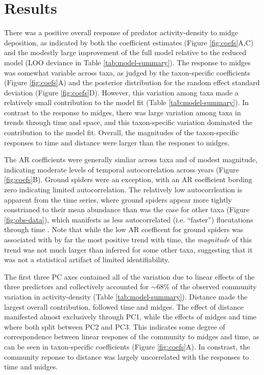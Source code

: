 

\section*{Results}

There was a positive overall response of predator activity-density to midge deposition,
as indicated by both the coefficient estimates (Figure \ref{fig:coefs}A,C)
and the modestly large improvement of the full model
relative to the reduced model (LOO deviance in Table \ref{tab:model-summary}).
The response to midges was somewhat variable across taxa,
as judged by the taxon-specific coefficients (Figure \ref{fig:coefs}A)
and the posterior distribution
for the random effect standard deviation (Figure \ref{fig:coefs}D).
However, this variation among taxa made a relatively small contribution
to the model fit (Table \ref{tab:model-summary}).
In contrast to the response to midges,
there was large variation among taxa in trends through time and space,
and this taxon-specific variation dominated the contribution to the model fit.
Overall, the magnitudes of the taxon-specific responses to time and distance
were larger than the respones to midges.

The AR coefficients were generally simliar across taxa and of modest magnitude,
indicating moderate levels of temporal autocorrelation across years
(Figure \ref{fig:coefs}B).
Ground spiders were an exception,
with an AR coefficient bording zero indicating limited autocorrelation.
The relatively low autocorrleation is apparent from the time series,
where ground spiders appear more tightly constrianed to their mean abundance
than was the case for other taxa (Figure \ref{fig:obs-data}),
which manifests as less autocorrelated (i.e. ``faster'') flucutations through time
\citep{Ziebarth2010}.
Note that while the low AR coefficent for ground spiders was associated
with by far the most positive trend with time,
the \textit{magnitude} of this trend was not much larger than inferred for some other taxa,
suggesting that it was not a statistical artifact of limited identifiability.

The first three PC axes contained all of the variation
due to linear effects of the three predictors and
collectively accounted for $\sim$68\% of the observed community variation
in activity-density (Table \ref{tab:model-summary}).
Distance made the largest overall contribution,
followed time and midges.
The effect of distance manifested almost exclusively through PC1,
while the effects of midges and time where both split between PC2 and PC3.
This indicates some degree of correspondence between linear respones of the community
to midges and time, as can be seen in taxon-specific coefficients
(Figure \ref{fig:coefs}A).
In constrast, the community reponse to distance
was largely uncorrelated with the responses to time and midges.


